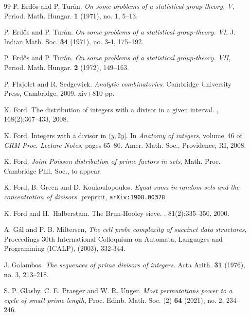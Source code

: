 \begin{thebibliography}{99}
 {\sc P. Erd{\H o}s and P. Tur{\' a}n}.
 \emph{On some problems of a statistical group-theory. V},
 Period. Math. Hungar.  {\bf 1}  (1971),  no. 1, 5--13.

 {\sc P. Erd{\H o}s and P. Tur{\' a}n}.
 \emph{On some problems of a statistical group-theory. VI},
 J. Indian Math. Soc.  {\bf 34}  (1971),  no. 3-4, 175--192.
		
 {\sc P. Erd{\H o}s and P. Tur{\' a}n}.
 \emph{On some problems of a statistical group-theory. VII},
 Period. Math. Hungar.  {\bf 2}  (1972), 149--163.
		
%
%
%
%
%

{\sc P. Flajolet and R. Sedgewick}.
\emph{Analytic combinatorics}. Cambridge University Press, Cambridge, 2009. xiv+810 pp. 


 {\sc K. Ford}.
\newblock The distribution of integers with a divisor in a given interval.
, 168(2):367--433, 2008.

 {\sc K. Ford}.
\newblock Integers with a divisor in {$(y,2y]$}.
\newblock In {\em Anatomy of integers}, volume~46 of {\em CRM Proc. Lecture
  Notes}, pages 65--80. Amer. Math. Soc., Providence, RI, 2008.


 {\sc K. Ford}.
{\it Joint Poisson distribution of prime factors in sets},
Math. Proc. Cambridge Phil. Soc., to appear.


{\sc K. Ford, B. Green and D. Koukoulopoulos}.
 \emph{Equal sums in random sets and the concentration of divisors.}  preprint, \texttt{arXiv:1908.00378}

{\sc K. Ford and H.~Halberstam}.
\newblock The {B}run-{H}ooley sieve.
, 81(2):335--350, 2000.


{\sc A. G{\' a}l and P. B.  Miltersen},
\emph{The cell probe complexity of succinct data structures}, Proceedings 30th International Colloquium on Automata, Languages and Programming (ICALP), (2003),  332-344.

{\sc J. Galambos}.
\emph{The sequences of prime divisors of integers.}
Acta Arith. {\bf 31} (1976), no. 3, 213--218. 

{\sc S. P. Glasby, C. E. Praeger and W.  R. Unger}.
\emph{Most permutations power to a cycle of small prime length},
 Proc. Edinb. Math. Soc. (2) {\bf 64} (2021), no. 2, 234--246. 



\end{thebibliography}
